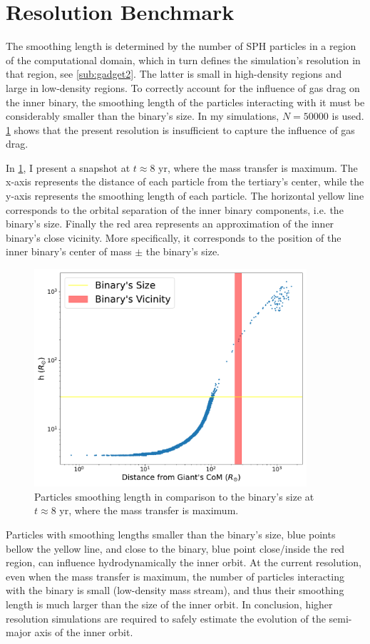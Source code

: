 \section{Resolution Benchmark}\label{sub:resolution}

The smoothing length is determined by the number of SPH particles in a region of the computational domain, which in turn defines the simulation's resolution in that region, see \cref{sub:gadget2}. The latter is small in high-density regions and large in low-density regions. To correctly account for the influence of gas drag on the inner binary, the smoothing length of the particles interacting with it must be considerably smaller than the binary's size. In my simulations, $N=50000$ is used. \cref{fig:resolution} shows that the present resolution is insufficient to capture the influence of gas drag.

In \cref{fig:resolution}, I present a snapshot at $t \approx 8$ yr, where the mass transfer is maximum. The x-axis represents the distance of each particle from the tertiary's center, while the y-axis represents the smoothing length of each particle. The horizontal yellow line corresponds to the orbital separation of the inner binary components, i.e. the binary's size. Finally the red area represents an approximation of the inner binary's close vicinity. More specifically, it corresponds to the position of the inner binary's center of mass $\pm$ the binary's size.
\begin{figure}[!htb]
    \centering
    \includegraphics[width=0.9\textwidth]{Thesis/graphs/resolution_benchmark.pdf}
    \caption{Particles smoothing length in comparison to the binary's size at $t \approx 8$ yr, where the mass transfer is maximum.}
    \label{fig:resolution}
\end{figure}
Particles with smoothing lengths smaller than the binary's size, blue points bellow the yellow line, and close to the binary, blue point close/inside the red region, can influence hydrodynamically the inner orbit. At the current resolution, even when the mass transfer is maximum, the number of particles interacting with the binary is small (low-density mass stream), and thus their smoothing length is much larger than the size of the inner orbit. In conclusion, higher resolution simulations are required to safely estimate the evolution of the semi-major axis of the inner orbit.

